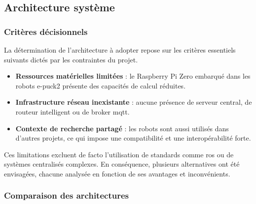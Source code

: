 \subsection{Architecture système} \label{sec:architecture_système}

\subsubsection{Critères décisionnels}
La détermination de l'architecture à adopter repose sur les critères essentiels suivants dictés par les contraintes du projet.
\begin{itemize}
    \item \textbf{Ressources matérielles limitées} : le Raspberry Pi Zero embarqué dans les robots e-puck2 présente des capacités de calcul réduites.
    
    \item \textbf{Infrastructure réseau inexistante} : aucune présence de serveur central, de routeur intelligent ou de broker \acrfull{mqtt}.
    
    \item \textbf{Contexte de recherche partagé} : les robots sont aussi utilisés dans d'autres projets, ce qui impose une compatibilité et une interopérabilité forte.
\end{itemize}

Ces limitations excluent de facto l'utilisation de standards comme \acrfull{ros} ou de systèmes centralisés complexes. 
En conséquence, plusieurs alternatives ont été envisagées, chacune analysée en fonction de ses avantages et inconvénients.

\subsubsection{Comparaison des architectures}

